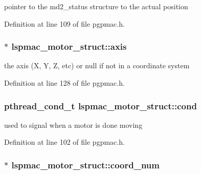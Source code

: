 pointer to the md2\-\_\-status structure to the actual position 



Definition at line 109 of file pgpmac.\-h.

\hypertarget{structlspmac__motor__struct_a7437ef16c2dce65bde4dda1ea00e9df3}{
\subsubsection[{axis}]{$\ast$ lspmac\-\_\-motor\-\_\-struct\-::axis}}\label{structlspmac__motor__struct_a7437ef16c2dce65bde4dda1ea00e9df3}


the axis (X, Y, Z, etc) or null if not in a coordinate system 



Definition at line 128 of file pgpmac.\-h.

\hypertarget{structlspmac__motor__struct_aa0ea4108b8fed5b41ff91ca7266f3d84}{
\subsubsection[{cond}]{\setlength{\rightskip}{0pt plus 5cm}pthread\-\_\-cond\-\_\-t lspmac\-\_\-motor\-\_\-struct\-::cond}}\label{structlspmac__motor__struct_aa0ea4108b8fed5b41ff91ca7266f3d84}


used to signal when a motor is done moving 



Definition at line 102 of file pgpmac.\-h.

\hypertarget{structlspmac__motor__struct_a5614e003272e8323f8809bf7b6559532}{
\subsubsection[{coord\-\_\-num}]{$\ast$ lspmac\-\_\-motor\-\_\-struct\-::coord\-\_\-num}}\label{structlspmac__motor__struct_a5614e003272e8323f8809bf7b6559532}


